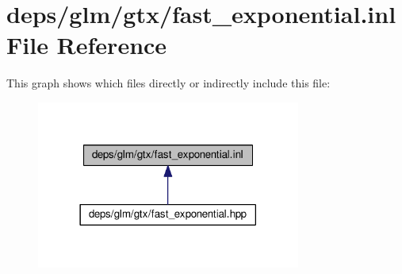 \hypertarget{fast__exponential_8inl}{}\section{deps/glm/gtx/fast\+\_\+exponential.inl File Reference}
\label{fast__exponential_8inl}
This graph shows which files directly or indirectly include this file\+:
\nopagebreak
\begin{figure}[H]
\begin{center}
\leavevmode
\includegraphics[width=246pt]{db/d86/fast__exponential_8inl__dep__incl}
\end{center}
\end{figure}
